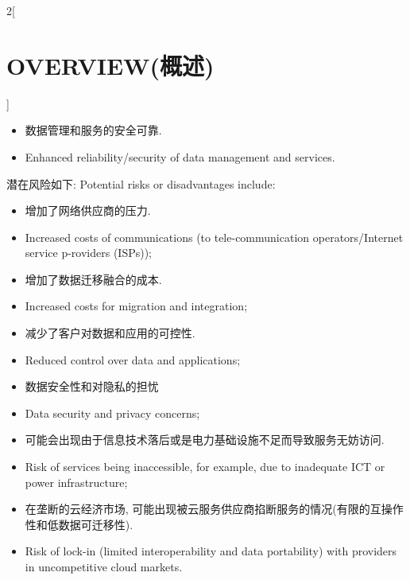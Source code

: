 \documentclass[a4paper, UTF8, 12pt]{article}
\begin{document}
\begin{paracol}{2}[\section{OVERVIEW(概述)}]
\begin{itemize}
        \switchcolumn*
        \item 数据管理和服务的安全可靠.
        \switchcolumn
        \item Enhanced reliability/security of data management and services. 
    \end{itemize}

    \switchcolumn*
    潜在风险如下:
    \switchcolumn
    Potential risks or disadvantages include:
    \begin{itemize}
        \switchcolumn*
        \item 增加了网络供应商的压力.
        \switchcolumn
        \item Increased costs of communications (to tele-communication operators/Internet service p-roviders (ISPs)); 
        
        \switchcolumn*
        \item 增加了数据迁移融合的成本.
        \switchcolumn
        \item Increased costs for migration and integration;
        
        \switchcolumn*
        \item 减少了客户对数据和应用的可控性.
        \switchcolumn
        \item Reduced control over data and applications;
        
        \switchcolumn*
        \item 数据安全性和对隐私的担忧
        \switchcolumn
        \item Data security and privacy concerns; 
        
        \switchcolumn*
        \item 可能会出现由于信息技术落后或是电力基础设施不足而导致服务无妨访问.
        \switchcolumn
        \item Risk of services being inaccessible, for example, due to inadequate ICT or power infrastructure;
        
        \switchcolumn*
        \item 在垄断的云经济市场, 可能出现被云服务供应商掐断服务的情况(有限的互操作性和低数据可迁移性).
        \switchcolumn
        \item Risk of lock-in (limited interoperability and data portability) with providers in uncompetitive cloud markets.
    \end{itemize}
    

\end{paracol}
\end{document}

